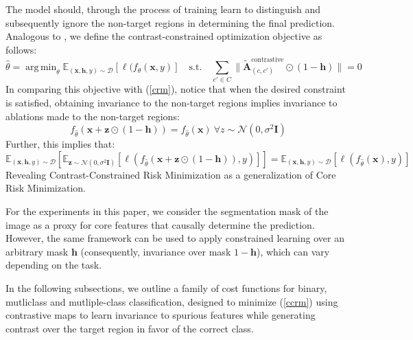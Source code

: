 \documentclass{article}
\theoremstyle{plain}
\theoremstyle{definition}
\theoremstyle{remark}
\newcommand{\contcam}[2]{\tilde{\mathcal{\bm{A}}}^{\text{contrastive}}_{(#1, #2)}}
\DeclareMathOperator*{\argmin}{arg\,min}
\begin{document}
The model should, through the process of training learn to distinguish and subsequently ignore the non-target regions in determining the final prediction. Analogous to \citep{singla2022core}, we define the contrast-constrained optimization objective as follows:
\begin{equation}\label{ccrm}
	\hat{\theta} = \argmin_\theta \mathbb{E}_{(\bm{x}, \bm{h}, y) \sim \mathcal{D}} \left[ \ell(f_\theta(\bm{x}, y) \right] \quad \text{s.t.} \quad \sum_{c' \in C} \| \contcam{c}{c'} \odot (1 - \bm{h}) \| = 0
\end{equation}
In comparing this objective with (\ref{crm}), notice that when the desired constraint is satisfied, obtaining invariance to the non-target regions implies invariance to ablations made to the non-target regions:
\begin{equation}
	f_{\hat{\theta}}(\bm{x} + \bm{z} \odot (1 - \bm{h})) = f_{\hat{\theta}}(\bm{x})~\forall z \sim \mathcal{N}(0, \sigma^2 \bm{I})
\end{equation}
Further, this implies that:
\begin{equation}
	\mathbb{E}_{(\bm{x}, \bm{h}, y) \sim \mathcal{D}} [ \mathbb{E}_{\bm{z} \sim \mathcal{N}(0, \sigma^2 \bm{I})} [\ell(f_{\hat{\theta}}(\bm{x} + \bm{z} \odot (1 - \bm{h})), y) ]] =
	\mathbb{E}_{(\bm{x}, \bm{h}, y) \sim \mathcal{D}} [ \ell(f_{\hat{\theta}}(\bm{x}), y) ]
\end{equation}
Revealing Contrast-Constrained Risk Minimization as a generalization of Core Risk Minimization.

For the experiments in this paper, we consider the segmentation mask of the image as a proxy for core features that causally determine the prediction. However, the same framework can be used to apply constrained learning over an arbitrary mask $\bm{h}$ (consequently, invariance over mask $1 - \bm{h}$), which can vary depending on the task.


In the following subsections, we outline a family of cost functions for binary, mutliclass and mutliple-class classification, designed to minimize (\ref{ccrm}) using contrastive maps to learn invariance to spurious features while generating contrast over the target region in favor of the correct class.
\end{document}
